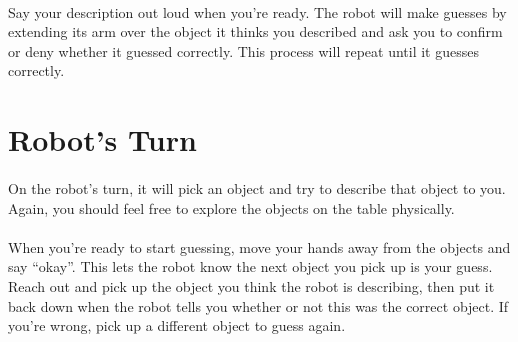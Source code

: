 \documentclass{article}
\begin{document}
\paragraph{} Say your description out loud when you're ready. The robot will make guesses by extending its arm over the object it thinks you described and ask you to confirm or deny whether it guessed correctly. This process will repeat until it guesses correctly.

\section {Robot's Turn}

\paragraph{} On the robot's turn, it will pick an object and try to describe that object to you. Again, you should feel free to explore the objects on the table physically.

\paragraph{} When you're ready to start guessing, move your hands away from the objects and say ``okay''. This lets the robot know the next object you pick up is your guess. Reach out and pick up the object you think the robot is describing, then put it back down when the robot tells you whether or not this was the correct object. If you're wrong, pick up a different object to guess again. 
\end{document}
